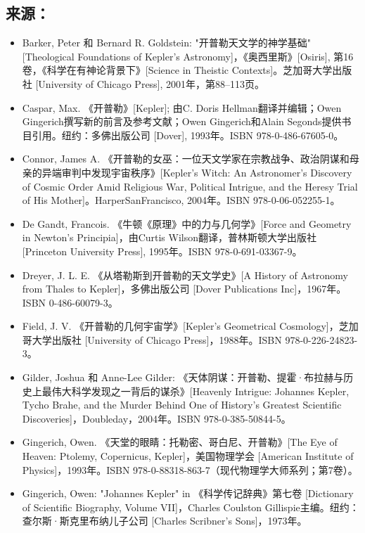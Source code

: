 \subsection{来源：}
\begin{itemize}
\item Barker, Peter 和 Bernard R. Goldstein: "开普勒天文学的神学基础" [Theological Foundations of Kepler's Astronomy]，《奥西里斯》[Osiris], 第16卷，《科学在有神论背景下》[Science in Theistic Contexts]。芝加哥大学出版社 [University of Chicago Press], 2001年，第88–113页。
\item Caspar, Max. 《开普勒》[Kepler]; 由C. Doris Hellman翻译并编辑；Owen Gingerich撰写新的前言及参考文献；Owen Gingerich和Alain Segonds提供书目引用。纽约：多佛出版公司 [Dover], 1993年。ISBN 978-0-486-67605-0。
\item Connor, James A. 《开普勒的女巫：一位天文学家在宗教战争、政治阴谋和母亲的异端审判中发现宇宙秩序》[Kepler's Witch: An Astronomer's Discovery of Cosmic Order Amid Religious War, Political Intrigue, and the Heresy Trial of His Mother]。HarperSanFrancisco, 2004年。ISBN 978-0-06-052255-1。
\item De Gandt, Francois. 《牛顿《原理》中的力与几何学》[Force and Geometry in Newton's Principia]，由Curtis Wilson翻译，普林斯顿大学出版社 [Princeton University Press], 1995年。ISBN 978-0-691-03367-9。
\item Dreyer, J. L. E. 《从塔勒斯到开普勒的天文学史》[A History of Astronomy from Thales to Kepler]，多佛出版公司 [Dover Publications Inc]，1967年。ISBN 0-486-60079-3。
\item Field, J. V. 《开普勒的几何宇宙学》[Kepler's Geometrical Cosmology]，芝加哥大学出版社 [University of Chicago Press]，1988年。ISBN 978-0-226-24823-3。
\item Gilder, Joshua 和 Anne-Lee Gilder: 《天体阴谋：开普勒、提霍·布拉赫与历史上最伟大科学发现之一背后的谋杀》[Heavenly Intrigue: Johannes Kepler, Tycho Brahe, and the Murder Behind One of History's Greatest Scientific Discoveries]，Doubleday，2004年。ISBN 978-0-385-50844-5。
\item Gingerich, Owen. 《天堂的眼睛：托勒密、哥白尼、开普勒》[The Eye of Heaven: Ptolemy, Copernicus, Kepler]，美国物理学会 [American Institute of Physics]，1993年。ISBN 978-0-88318-863-7（现代物理学大师系列；第7卷）。
\item Gingerich, Owen: "Johannes Kepler" in 《科学传记辞典》第七卷 [Dictionary of Scientific Biography, Volume VII]，Charles Coulston Gillispie主编。纽约：查尔斯·斯克里布纳儿子公司 [Charles Scribner's Sons]，1973年。

\end{itemize}

